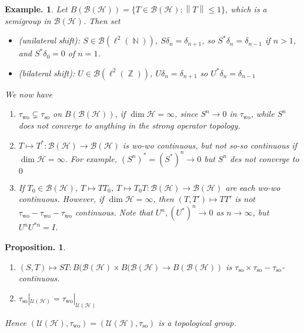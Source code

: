 \documentclass[11pt, a4paper]{memoir}
\DeclareMathOperator{\N}{{\mathbb{N}}}
\DeclareMathOperator{\Z}{{\mathbb{Z}}}
\newcommand{\norm}[1]{\ensuremath{\left\lVert#1\right\rVert}}
\theoremstyle{change}
\newtheorem{proposition}[theorem]{Proposition.}
\theoremstyle{plain}
\theoremstyle{nonumberplain}
\newtheorem{example}{Example.}
\newcommand{\defname}[1]{{\textit{(#1)}:}}
\numberwithin{equation}{section}
\begin{document}
\begin{example}
    Let $B(\mathcal{B}(\mathcal{H}))=\{T\in\mathcal{B}(\mathcal{H}):\norm{T}\leq 1\}$, which is a semigroup in $\mathcal{B}(\mathcal{H})$.
    Then set
    \begin{itemize}[nl]
        \item\defname{unilateral shift}
            $S\in\mathcal{B}(\ell^2(\N))$, $S\delta_n=\delta_{n+1}$, so $S^*\delta_n=\delta_{n-1}$ if $n>1$, and $S^*\delta_0=0$ of $n=1$.
        \item\defname{bilateral shift}
            $U\in\mathcal{B}(\ell^2(\Z))$, $U\delta_n=\delta_{n+1}$ so $U^*\delta_n=\delta_{n-1}$
    \end{itemize}
    We now have
    \begin{enumerate}[nl,a]
        \item $\tau_{\mathrm{wo}}\subsetneq\tau_{\mathrm{so}}$ on $B(\mathcal{B}(\mathcal{H}))$, if $\dim\mathcal{H}=\infty$, since $S^n\to 0$ in $\tau_{\mathrm{wo}}$, while $S^n$ does not converge to anything in the strong operator topology.
        \item $T\mapsto T^*:\mathcal{B}(\mathcal{H})\to\mathcal{B}(\mathcal{H})$ is wo-wo continuous, but not so-so continuous if $\dim\mathcal{H}=\infty$.
            For example, $(S^n)^*=(S^*)^n\to 0$ but $S^n$ des not converge to $0$
        \item If $T_0\in\mathcal{B}(\mathcal{H})$, $T\mapsto TT_0$, $T\mapsto T_0T:\mathcal{B}(\mathcal{H})\to\mathcal{B}(\mathcal{H})$ are each wo-wo continuous.
            However, if $\dim\mathcal{H}=\infty$, then $(T,T')\mapsto TT'$ is not $\tau_{\mathrm{wo}}-\tau_{\mathrm{wo}}-\tau_{\mathrm{wo}}$ continuous.
            Note that $U^n,(U^*)^n\to 0$ as $n\to\infty$, but $U^nU^{*n}=I$.
    \end{enumerate}
\end{example}
\begin{proposition}
    \begin{enumerate}[nl,r]
        \item $(S,T)\mapsto ST:B(\mathcal{B}(\mathcal{H})\times B(\mathcal{B}(\mathcal{H})\to B(\mathcal{B}(\mathcal{H}))$ is $\tau_{\mathrm{so}}\times\tau_{\mathrm{so}}-\tau_{\mathrm{so}}$-continuous.
        \item $\tau_{\mathrm{so}}|_{\mathcal{U}(\mathcal{H})}=\tau_{\mathrm{wo}}|_{\mathcal{U}(\mathcal{H})}$
    \end{enumerate}
    Hence $(\mathcal{U}(\mathcal{H}),\tau_{\mathrm{wo}})=(\mathcal{U}(\mathcal{H}),\tau_{\mathrm{so}})$ is a topological group.
\end{proposition}
\end{document}
